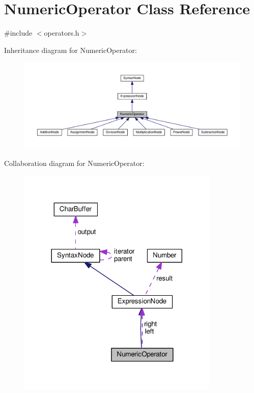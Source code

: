 \hypertarget{classNumericOperator}{}\section{Numeric\+Operator Class Reference}
\label{classNumericOperator}


{\ttfamily \#include $<$operators.\+h$>$}



Inheritance diagram for Numeric\+Operator\+:
\nopagebreak
\begin{figure}[H]
\begin{center}
\leavevmode
\includegraphics[width=350pt]{d6/dd3/classNumericOperator__inherit__graph}
\end{center}
\end{figure}


Collaboration diagram for Numeric\+Operator\+:
\nopagebreak
\begin{figure}[H]
\begin{center}
\leavevmode
\includegraphics[width=272pt]{d5/d04/classNumericOperator__coll__graph}
\end{center}
\end{figure}
